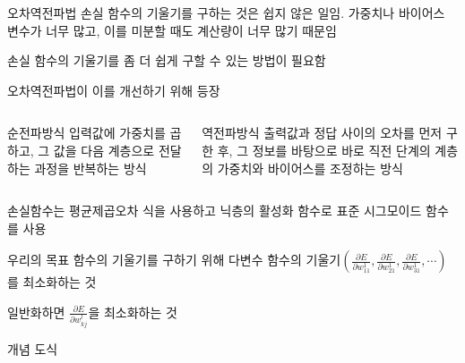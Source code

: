 \documentclass[10pt,t]{beamer}
\begin{document}
\begin{frame}{오차역전파법}
    손실 함수의 기울기를 구하는 것은 쉽지 않은 일임. 가중치나 바이어스 변수가 너무 많고, 이를 미분할 때도 계산량이 너무 많기 때문임

    손실 함수의 기울기를 좀 더 쉽게 구할 수 있는 방법이 필요함

    오차역전파법이 이를 개선하기 위해 등장

    \begin{columns}
        \begin{block}{순전파방식}
            입력값에 가중치를 곱하고, 그 값을 다음 계층으로 전달하는 과정을 반복하는 방식
        \end{block}
        \begin{block}{역전파방식}
            출력값과 정답 사이의 오차를 먼저 구한 후, 그 정보를 바탕으로 바로 직전 단계의 계층의 가중치와 바이어스를 조정하는 방식
        \end{block}
    \end{columns}

    \vspace{1em}
    손실함수는 평균제곱오차 식을 사용하고 닉층의 활성화 함수로 표준 시그모이드 함수를 사용

\begin{block}{우리의 목표}
    함수의 기울기를 구하기 위해 다변수 함수의 기울기$\left(\frac{\partial E}{\partial w_{11}^1} , \frac{\partial E}{\partial w_{21}^1}, \frac{\partial E}{\partial w_{31}^1}, \cdots \right)$를 최소화하는 것

    일반화하면 $\frac{\partial E}{\partial w_{kj}^l}$을 최소화하는 것
\end{block}

    \pagebreak

    개념 도식
\vspace{-2em}
\begin{center}  

\end{center}
\end{frame}
\end{document}
